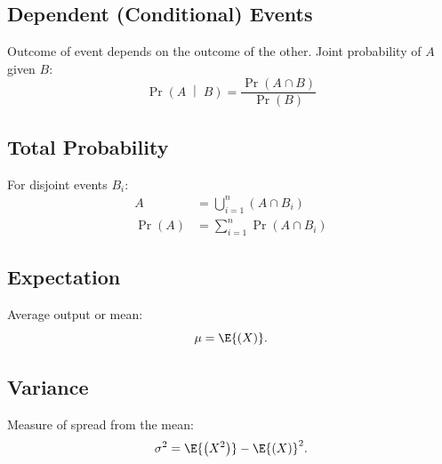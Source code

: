 \documentclass{article}
\begin{document}
\begin{multicols}{3}
    \subsection*{Dependent (Conditional) Events}
    Outcome of event depends on the outcome of the other. Joint probability of \(A\) given \(B\):
    \begin{equation*}
        \Pr{\left(A \;\middle|\; B\right)} = \frac{\Pr{\left( A \cap B \right)}}{\Pr{\left( B \right)}}
    \end{equation*}
    \subsection*{Total Probability}
    For disjoint events \(B_i\):
    \begin{align*}
        A                     & = \bigcup\limits_{i=1}^n \left( A \cap B_i \right) \\
        \Pr{\left( A \right)} & = \sum_{i=1}^n \Pr{\left( A \cap B_i \right)}
    \end{align*}
    \subsection*{Expectation}
    Average output or mean:
    \begin{equation*}
        \mu = \E{\left( X \right)}.
    \end{equation*}
    \subsection*{Variance}
    Measure of spread from the mean:
    \begin{equation*}
        \sigma^2 = \E{\left( X^2 \right)} - \E{\left( X \right)}^2.
    \end{equation*}
\end{multicols}
\end{document}

